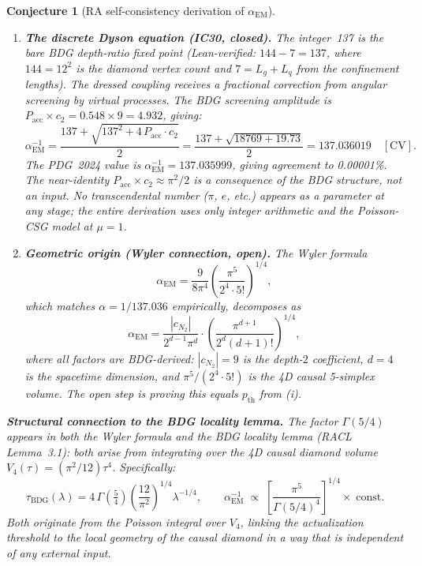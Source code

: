 \documentclass[11pt,a4paper]{article}
\newtheorem{conjecture}[theorem]{Conjecture}
\begin{document}
\begin{conjecture}[RA self-consistency derivation of $\alpha_{\mathrm{EM}}$]
\begin{enumerate}[label=(\roman*), noitemsep]
  \item \textbf{The discrete Dyson equation (IC30, closed).}
  The integer~137 is the bare BDG depth-ratio fixed point
  (Lean-verified: $144 - 7 = 137$, where $144 = 12^2$ is the
  diamond vertex count and $7 = L_g + L_q$ from the confinement
  lengths). The dressed coupling receives a fractional correction
  from angular screening by virtual processes. The BDG screening
  amplitude is $P_{\mathrm{acc}} \times c_2 = 0.548 \times 9 = 4.932$,
  giving:
  \begin{equation}
    \alpha_{\mathrm{EM}}^{-1}
    = \frac{137 + \sqrt{137^2 + 4\,P_{\mathrm{acc}}\cdot c_2}}{2}
    = \frac{137 + \sqrt{18769 + 19.73}}{2}
    = 137.036019 \quad[\text{CV}].
    \label{eq:alpha_ic30}
  \end{equation}
  The PDG~2024 value is $\alpha_{\mathrm{EM}}^{-1} = 137.035999$,
  giving agreement to 0.00001\%. The near-identity
  $P_{\mathrm{acc}} \times c_2 \approx \pi^2/2$ is a
  \emph{consequence} of the BDG structure, not an input. No
  transcendental number ($\pi$, $e$, etc.) appears as a parameter
  at any stage; the entire derivation uses only integer arithmetic
  and the Poisson-CSG model at $\mu=1$.

  \item \textbf{Geometric origin (Wyler connection, open).}
  The Wyler formula
  \begin{equation}
    \alpha_{\mathrm{EM}} = \frac{9}{8\pi^4}
    \left(\frac{\pi^5}{2^4 \cdot 5!}\right)^{1/4},
    \label{eq:wyler}
  \end{equation}
  which matches $\alpha = 1/137.036$ empirically, decomposes as
  \begin{equation}
    \alpha_{\mathrm{EM}} = \frac{|c_{N_2}|}{2^{d-1}\pi^d}
    \cdot \left(\frac{\pi^{d+1}}{2^d(d{+}1)!}\right)^{1/4},
  \end{equation}
  where all factors are BDG-derived: $|c_{N_2}| = 9$ is the
  depth-$2$ coefficient, $d = 4$ is the spacetime dimension,
  and $\pi^5/(2^4 \cdot 5!)$ is the 4D causal 5-simplex volume.
  The open step is proving this equals $p_{\mathrm{th}}$ from (i).
\end{enumerate}

\noindent
\textbf{Structural connection to the BDG locality lemma.}
The factor $\Gamma(5/4)$ appears in both the Wyler formula and the
BDG locality lemma (RACL Lemma~3.1): both arise from integrating
over the 4D causal diamond volume $V_4(\tau) = (\pi^2/12)\tau^4$.
Specifically:
\begin{equation}
  \tau_{\mathrm{BDG}}(\lambda)
  = 4\,\Gamma\!\left(\tfrac{5}{4}\right)
    \left(\frac{12}{\pi^2}\right)^{\!1/4} \lambda^{-1/4},
  \qquad
  \alpha_{\mathrm{EM}}^{-1} \;\propto\;
  \left[\frac{\pi^5}{\Gamma(5/4)^4}\right]^{1/4} \!\times\; \text{const}.
\end{equation}
Both originate from the Poisson integral over $V_4$, linking the
actualization threshold to the local geometry of the causal diamond
in a way that is independent of any external input.


\end{conjecture}
\end{document}
